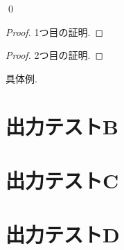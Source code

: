 \documentclass[uplatex, dvipdfmx, a4paper, 12pt, class=jsbook, crop=false]{standalone}
\begin{document}
\begin{definition}[テスト定義B]
	\label{def:test-def-B}
	\lipsum[1][2]
\end{definition}

\begin{theorem}[テスト定理A]
	\label{thm:test-thm-A}
	\WIP
	\lipsum[1][2]
\end{theorem}

\begin{corollary}
	\label{cor:test-corollary-A}
	\lipsum[1][2]
	\qed
\end{corollary}

\begin{corollary}
	\label{cor:test-corollary-B}
	\lipsum[1][2]
\end{corollary}

\begin{proposition}
	\label{prop:test-prop-A}
	\lipsum[1][2]
\end{proposition}

\begin{proof}
	\label{pf:test-proof-A}
	1つ目の証明.
\end{proof}

\begin{proof}
	\label{pf:test-proof-B}
	2つ目の証明.
\end{proof}

\begin{example}
	\label{ex:example-space-A}
	具体例.
\end{example}

\begin{problem}
	\label{prob:test-problem-A}
	\WIP
	\lipsum[1][2]
\end{problem}

\section{出力テストB}
\label{sec:test-B}
\lipsum[2-3]

\section{出力テストC}
\label{sec:test-C}
\WIP
\lipsum[4][1]

\section{出力テストD}
\label{sec:test-D}
\lipsum[4][1-3]
\end{document}
